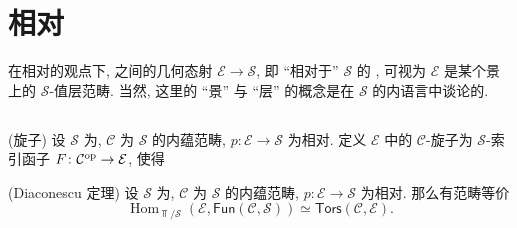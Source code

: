 \chapter{相对\topos{}}

\minitoc

在相对的观点下, \topos{}之间的几何态射 $\mathcal E\to \mathcal S$, 即 ``相对于'' $\mathcal S$ 的 \topos{}, 可视为 $\mathcal E$ 是某个景上的 $\mathcal S$-值层范畴. 当然, 这里的 ``景'' 与 ``层'' 的概念是在 $\mathcal S$ 的内语言中谈论的.



%
%	

\section{}

\begin{definition}
	{(旋子)}
	设 $\mathcal S$ 为\topos{}, $\mathcal C$ 为 $\mathcal S$ 的内蕴范畴, $p\colon \mathcal E\to\mathcal S$ 为相对\topos{}. 定义 $\mathcal E$ 中的 $\mathcal C$-旋子为 $\mathcal S$-索引函子 $F\colon \mathcal C^{\text{op}}\to\mathcal E$, 使得
\end{definition}

\begin{prop}
	{(Diaconescu 定理)}
	设 $\mathcal S$ 为\topos{}, $\mathcal C$ 为 $\mathcal S$ 的内蕴范畴, $p\colon \mathcal E\to\mathcal S$ 为相对\topos{}. 那么有范畴等价
	\[
	\operatorname{Hom}_{\Top/\mathcal S}
	(\mathcal E,\mathsf {Fun}(\mathcal C,\mathcal S))
	\simeq \mathsf {Tors}(\mathcal C,\mathcal E).
	\]
\end{prop}

